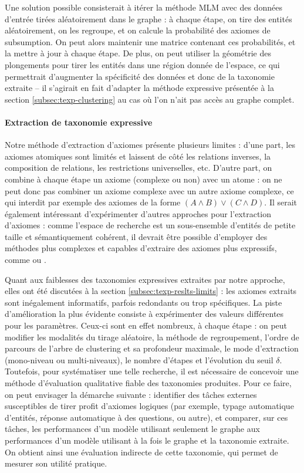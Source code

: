 Une solution possible consisterait à itérer la méthode MLM avec des données d'entrée tirées aléatoirement dans le graphe : à chaque étape, on tire des entités aléatoirement, on les regroupe, et on calcule la probabilité des axiomes de subsumption. On peut alors maintenir une matrice contenant ces probabilités, et la mettre à jour à chaque étape. De plus, on peut utiliser la géométrie des plongements pour tirer les entités dans une région donnée de l'espace, ce qui permettrait d'augmenter la spécificité des données et donc de la taxonomie extraite – il s'agirait en fait d'adapter la méthode expressive présentée à la section \ref{subsec:texp-clustering} au cas où l'on n'ait pas accès au graphe complet.


\paragraph{Extraction de taxonomie expressive}


Notre méthode d'extraction d'axiomes présente plusieurs limites : d'une part, les axiomes atomiques sont limités et laissent de côté les relations inverses, la composition de relations, les restrictions universelles, etc. D'autre part, on combine à chaque étape un axiome (complexe ou non) avec un atome : on ne peut donc pas combiner un axiome complexe avec un autre axiome complexe, ce qui interdit par exemple des axiomes de la forme $(A \land B) \lor (C \land D)$. Il serait également intéressant d'expérimenter d'autres approches pour l'extraction d'axiomes : comme l'espace de recherche est un sous-ensemble d'entités de petite taille et sémantiquement cohérent, il devrait être possible d'employer des méthodes plus complexes et capables d'extraire des axiomes plus expressifs, comme \cite{vlog2019carral} ou \cite{lajus2020amie}.

Quant aux faiblesses des taxonomies expressives extraites par notre approche, elles ont été discutées à la section \ref{subsec:texp-reslts-limits} : les axiomes extraits sont inégalement informatifs, parfois redondants ou trop spécifiques. La piste d'amélioration la plus évidente consiste à expérimenter des valeurs différentes pour les paramètres. Ceux-ci sont en effet nombreux, à chaque étape : on peut modifier les modalités du tirage aléatoire, la méthode de regroupement, l'ordre de parcours de l'arbre de clustering et sa profondeur maximale, le mode d'extraction (mono-niveau ou multi-niveaux), le nombre d'étapes et l'évolution du seuil $\delta$. Toutefois, pour systématiser une telle recherche, il est nécessaire de concevoir une méthode d'évaluation qualitative fiable des taxonomies produites. Pour ce faire, on peut envisager la démarche suivante : identifier des tâches externes susceptibles de tirer profit d'axiomes logiques (par exemple, typage automatique d'entités, réponse automatique à des questions, ou autre), et comparer, sur ces tâches, les performances d'un modèle utilisant seulement le graphe aux performances d'un modèle utilisant à la fois le graphe et la taxonomie extraite. On obtient ainsi une évaluation indirecte de cette taxonomie, qui permet de mesurer son utilité pratique.


